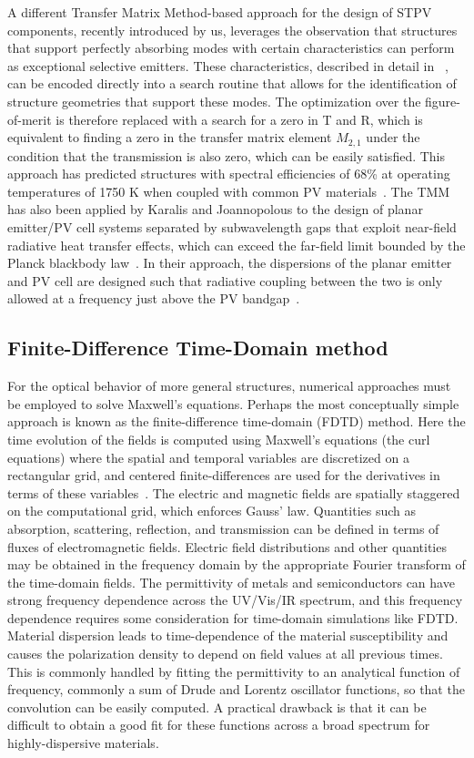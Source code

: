 \documentclass[review]{elsarticle}
\begin{document}
A different Transfer Matrix Method-based approach for the design of STPV components, recently introduced by us, 
leverages the observation that structures that support perfectly absorbing modes with 
certain characteristics can perform as exceptional selective emitters.  These characteristics, described in detail in
~\cite{FUS_OptExp_2015}, can be
encoded directly into a search routine that allows for the identification of structure geometries that support these modes.  The
optimization over the figure-of-merit is therefore replaced with a search for a zero in T and R, which is equivalent to finding
a zero in the transfer matrix element $M_{2,1}$ under the condition that the transmission is also zero, which can be easily satisfied.
This approach has predicted structures with spectral efficiencies of 68\% at operating temperatures of 1750 K when coupled
with common PV materials~\cite{FUS_OptExp_2015}. The TMM has also been applied by Karalis and Joannopolous to the design of planar emitter/PV cell
systems separated by subwavelength gaps that exploit near-field radiative heat transfer effects, which can exceed the far-field
limit bounded by the Planck blackbody law~\cite{KJ_SciRep_2016}.  In their approach, the dispersions of the planar emitter and PV cell are designed
such that radiative coupling between the two is only allowed at a frequency just above the PV bandgap~\cite{KJ_SciRep_2016}.

\subsection{Finite-Difference Time-Domain method}

For the optical behavior of more general structures, numerical approaches must be employed to solve Maxwell's equations.  Perhaps the
most conceptually simple approach is known as the finite-difference time-domain (FDTD) method.  Here the time evolution of the fields
is computed using Maxwell's equations (the curl equations) where the spatial and temporal variables are discretized on a rectangular
grid, and centered finite-differences are used for the derivatives in terms of these variables~\cite{Taflove_FDTD}.
The electric and magnetic fields are spatially
staggered on the computational grid, which enforces Gauss' law.  Quantities such as absorption, scattering, reflection, and transmission
can be defined in terms of fluxes of electromagnetic fields.  Electric field distributions and other quantities may be obtained in the
frequency domain by the appropriate Fourier transform of the time-domain fields.  The permittivity of metals and semiconductors can
have strong frequency dependence across the UV/Vis/IR spectrum, and this frequency dependence requires some consideration for time-domain
simulations like FDTD.  
Material dispersion leads to time-dependence of the material susceptibility and 
causes the polarization
density to depend on field values at all previous times.  
This is commonly handled by fitting the permittivity to an analytical
function of frequency, commonly a sum of Drude and Lorentz oscillator functions, so that the convolution can be easily computed.  A
practical drawback is that it can be difficult to obtain a good fit for these functions across a broad spectrum for highly-dispersive materials.
\end{document}

